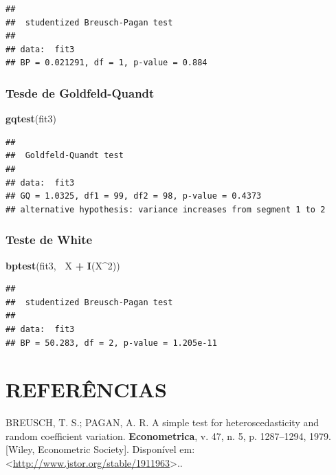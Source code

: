 \documentclass[a4paper, 12pt]{article}
\newenvironment{Shaded}{\begin{snugshade}}{\end{snugshade}}
\newcommand{\DecValTok}[1]{\textcolor[rgb]{0.00,0.00,0.81}{#1}}
\newcommand{\KeywordTok}[1]{\textcolor[rgb]{0.13,0.29,0.53}{\textbf{#1}}}
\newcommand{\NormalTok}[1]{#1}
\newcommand{\OperatorTok}[1]{\textcolor[rgb]{0.81,0.36,0.00}{\textbf{#1}}}
\newcommand{\StringTok}[1]{\textcolor[rgb]{0.31,0.60,0.02}{#1}}
\begin{document}
\begin{verbatim}
## 
##  studentized Breusch-Pagan test
## 
## data:  fit3
## BP = 0.021291, df = 1, p-value = 0.884
\end{verbatim}

\hypertarget{tesde-de-goldfeld-quandt-2}{%
\subsubsection{Tesde de
Goldfeld-Quandt}\label{tesde-de-goldfeld-quandt-2}}

\begin{Shaded}
\begin{Highlighting}[]
\KeywordTok{gqtest}\NormalTok{(fit3)}
\end{Highlighting}
\end{Shaded}

\begin{verbatim}
## 
##  Goldfeld-Quandt test
## 
## data:  fit3
## GQ = 1.0325, df1 = 99, df2 = 98, p-value = 0.4373
## alternative hypothesis: variance increases from segment 1 to 2
\end{verbatim}

\hypertarget{teste-de-white-3}{%
\subsubsection{Teste de White}\label{teste-de-white-3}}

\begin{Shaded}
\begin{Highlighting}[]
\KeywordTok{bptest}\NormalTok{(fit3, }\OperatorTok{~}\NormalTok{X }\OperatorTok{+}\StringTok{ }\KeywordTok{I}\NormalTok{(X}\OperatorTok{^}\DecValTok{2}\NormalTok{))}
\end{Highlighting}
\end{Shaded}

\begin{verbatim}
## 
##  studentized Breusch-Pagan test
## 
## data:  fit3
## BP = 50.283, df = 2, p-value = 1.205e-11
\end{verbatim}

\hypertarget{referencias}{%
\section*{REFERÊNCIAS}\label{referencias}}

\hypertarget{refs}{}
\leavevmode\hypertarget{ref-BP}{}%
BREUSCH, T. S.; PAGAN, A. R. A simple test for heteroscedasticity and
random coefficient variation. \textbf{Econometrica}, v. 47, n. 5, p.
1287--1294, 1979. {[}Wiley, Econometric Society{]}. Disponível em:
\textless{}\url{http://www.jstor.org/stable/1911963}\textgreater{}..
\end{document}
